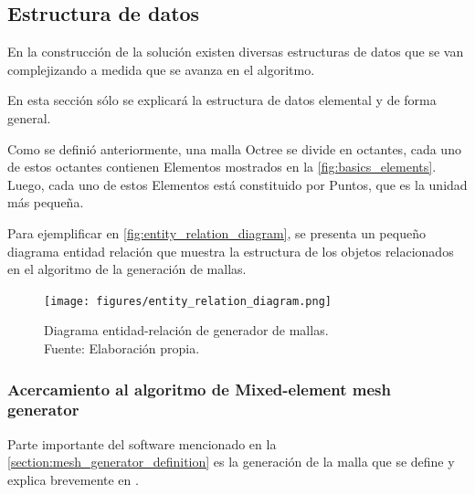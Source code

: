 \subsection{Estructura de datos}

En la construcción de la solución existen diversas estructuras de datos que se van complejizando a medida que se avanza en el algoritmo.

En esta sección sólo se explicará la estructura de datos elemental y de forma general. 

Como se definió anteriormente, una malla Octree se divide en octantes, cada uno de estos octantes contienen Elementos mostrados en la \autoref{fig:basics_elements}.  Luego, cada uno de estos Elementos está constituido por Puntos, que es la unidad más pequeña.

Para ejemplificar en \autoref{fig:entity_relation_diagram}, se presenta un pequeño diagrama entidad relación que muestra la estructura de los objetos relacionados en el algoritmo de la generación de mallas.



\begin{figure}[H]
	\centering
	\texttt{[image: figures/entity\_relation\_diagram.png]}
	\caption{Diagrama entidad-relación de generador de mallas.\\  Fuente: Elaboración propia.}
	\label{fig:entity_relation_diagram}
\end{figure}

\subsubsection{Acercamiento al algoritmo de Mixed-element mesh generator}

Parte importante del software mencionado en la \autoref{section:mesh_generator_definition} es la generación de la malla que se define y explica brevemente en \cite{daines2018repairing}.


